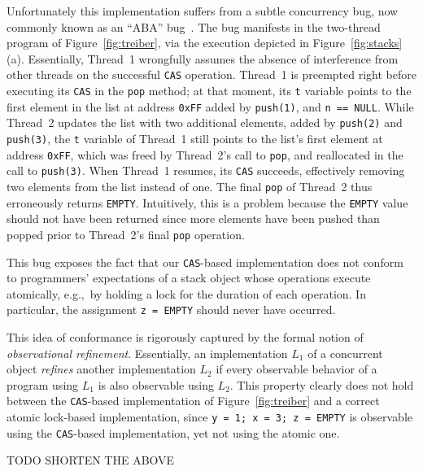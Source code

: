 Unfortunately this implementation suffers from a subtle concurrency bug, now
commonly known as an ``ABA'' bug~\cite{tr/ibm/Michael04}. The bug manifests in
the two-thread program of Figure~\ref{fig:treiber}, via the execution depicted
in Figure~\ref{fig:stacks}(a). Essentially, Thread~1 wrongfully assumes the
absence of interference from other threads on the successful {\tt CAS}
operation. Thread~1 is preempted right before executing its {\tt CAS} in the
{\tt pop} method; at that moment, its {\tt t} variable points to the first
element in the list at address {\tt 0xFF} added by {\tt push(1)}, and {\tt n ==
NULL}. While Thread~2 updates the list with two additional elements, added by
{\tt push(2)} and {\tt push(3)}, the {\tt t} variable of Thread~1 still points
to the list's first element at address {\tt 0xFF}, which was freed by
Thread~2's call to {\tt pop}, and reallocated in the call to {\tt push(3)}.
When Thread~1 resumes, its {\tt CAS} succeeds, effectively removing two
elements from the list instead of one. The final {\tt pop} of Thread~2 thus
erroneously returns {\tt EMPTY}. Intuitively, this is a problem because the
{\tt EMPTY} value should not have been returned since more elements have been
pushed than popped prior to Thread~2's final {\tt pop} operation.

This bug exposes the fact that our {\tt CAS}-based implementation does not
conform to programmers' expectations of a stack object whose operations
execute atomically, e.g.,~by holding a lock for the duration of each operation.
In particular, the assignment {\tt z = EMPTY} should never have occurred.

This idea of conformance is rigorously captured by the formal notion of
\emph{observational refinement}. Essentially, an implementation $L_1$ of a
concurrent object \emph{refines} another implementation $L_2$ if every
observable behavior of a program using $L_1$ is also observable using $L_2$.
This property clearly does not hold between the {\tt CAS}-based implementation
of Figure~\ref{fig:treiber} and a correct atomic lock-based implementation,
since {\tt y = 1; x = 3; z = EMPTY} is observable using the {\tt CAS}-based
implementation, yet not using the atomic one.

TODO SHORTEN THE ABOVE

